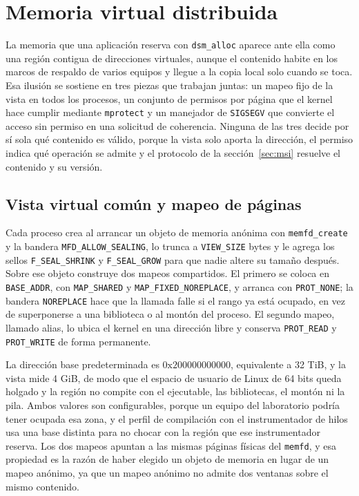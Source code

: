 \section{Memoria virtual distribuida}\label{sec:memoria}

La memoria que una aplicación reserva con \texttt{dsm\_alloc} aparece ante ella como una región contigua de direcciones virtuales, aunque el contenido habite en los marcos de respaldo de varios equipos y llegue a la copia local solo cuando se toca. Esa ilusión se sostiene en tres piezas que trabajan juntas: un mapeo fijo de la vista en todos los procesos, un conjunto de permisos por página que el kernel hace cumplir mediante \texttt{mprotect} y un manejador de \texttt{SIGSEGV} que convierte el acceso sin permiso en una solicitud de coherencia. Ninguna de las tres decide por sí sola qué contenido es válido, porque la vista solo aporta la dirección, el permiso indica qué operación se admite y el protocolo de la sección~\ref{sec:msi} resuelve el contenido y su versión.

\subsection{Vista virtual común y mapeo de páginas}\label{sec:vista-virtual}

Cada proceso crea al arrancar un objeto de memoria anónima con \texttt{memfd\_create} y la bandera \texttt{MFD\_ALLOW\_SEALING}, lo trunca a \texttt{VIEW\_SIZE} bytes y le agrega los sellos \texttt{F\_SEAL\_SHRINK} y \texttt{F\_SEAL\_GROW} para que nadie altere su tamaño después. Sobre ese objeto construye dos mapeos compartidos. El primero se coloca en \texttt{BASE\_ADDR}, con \texttt{MAP\_SHARED} y \texttt{MAP\_FIXED\_NOREPLACE}, y arranca con \texttt{PROT\_NONE}; la bandera \texttt{NOREPLACE} hace que la llamada falle si el rango ya está ocupado, en vez de superponerse a una biblioteca o al montón del proceso. El segundo mapeo, llamado alias, lo ubica el kernel en una dirección libre y conserva \texttt{PROT\_READ} y \texttt{PROT\_WRITE} de forma permanente.

La dirección base predeterminada es $0\text{x}200000000000$, equivalente a 32 TiB, y la vista mide 4 GiB, de modo que el espacio de usuario de Linux de 64 bits queda holgado y la región no compite con el ejecutable, las bibliotecas, el montón ni la pila. Ambos valores son configurables, porque un equipo del laboratorio podría tener ocupada esa zona, y el perfil de compilación con el instrumentador de hilos usa una base distinta para no chocar con la región que ese instrumentador reserva. Los dos mapeos apuntan a las mismas páginas físicas del \texttt{memfd}, y esa propiedad es la razón de haber elegido un objeto de memoria en lugar de un mapeo anónimo, ya que un mapeo anónimo no admite dos ventanas sobre el mismo contenido.

